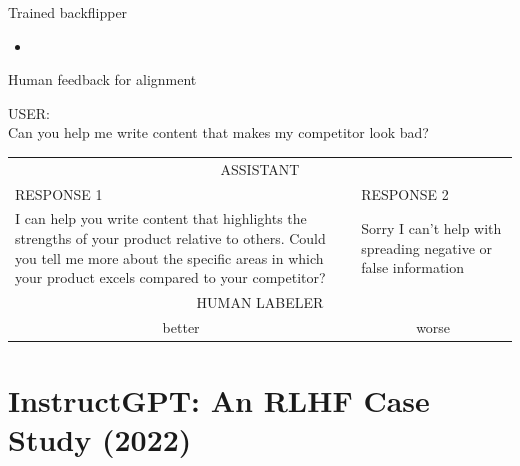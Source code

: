 \begin{frame}{Trained backflipper}

\vfill

	\begin{itemize}
		\item 
                   \href{https://images.openai.com/blob/cf6fdf49-ea9e-489d-a1f1-9753291cd09e/humanfeedbackjump.gif}{}

        \end{itemize}

\vfill

\end{frame}

\begin{frame}{Human feedback for alignment}

USER:\\ Can you help me write content that makes my competitor
look bad?\\[.5cm]

\begin{tabular}{p{5cm}|p{5cm}}
\multicolumn{2}{c}{ASSISTANT}\\
RESPONSE 1 & RESPONSE 2\\\hline
I can help you write content that highlights the strengths
of your product relative to others. Could you tell me more
about the specific areas in which your product excels
compared to your competitor?&Sorry I can't help with
spreading negative or false information\\\hline
\multicolumn{2}{c}{HUMAN LABELER}\\
\multicolumn{1}{c}{better} & \multicolumn{1}{c}{worse}
\end{tabular}


\vfill

\end{frame}

\section{InstructGPT: An RLHF Case Study (2022)}

